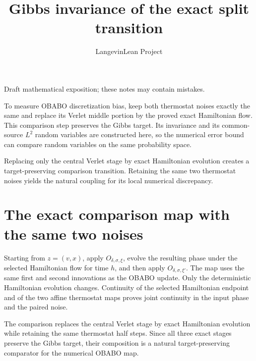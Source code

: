 \documentclass[11pt,a4paper]{article}
\title{\texorpdfstring{Gibbs invariance of the exact split transition}{Gibbs invariance of the exact split transition}}
\author{LangevinLean Project}
\date{}
\begin{document}
\maketitle
Draft mathematical exposition; these notes may contain mistakes.


To measure OBABO discretization bias, keep both thermostat noises exactly the same and replace its Verlet middle portion by the proved exact Hamiltonian flow. This comparison step preserves the Gibbs target. Its invariance and its common-source \(L^{2}\) random variables are constructed here, so the numerical error bound can compare random variables on the same probability space.



Replacing only the central Verlet stage by exact Hamiltonian evolution creates a target-preserving comparison transition. Retaining the same two thermostat noises yields the natural coupling for its local numerical discrepancy.


\section{\texorpdfstring{The exact comparison map with the same two noises}{The exact comparison map with the same two noises}}


Starting from \(z=(v,x)\), apply \(O_{\delta,\sigma,\xi}\), evolve the resulting phase under the selected Hamiltonian flow for time \(h\), and then apply \(O_{\delta,\sigma,\xi\prime}\). The map uses the same first and second innovations as the OBABO update. Only the deterministic Hamiltonian evolution changes. Continuity of the selected Hamiltonian endpoint and of the two affine thermostat maps proves joint continuity in the input phase and the paired noise.



The comparison replaces the central Verlet stage by exact Hamiltonian evolution while retaining the same thermostat half steps. Since all three exact stages preserve the Gibbs target, their composition is a natural target-preserving comparator for the numerical OBABO map.
\end{document}
